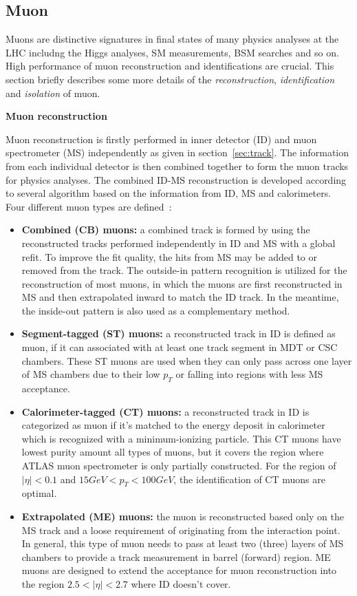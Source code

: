 \subsection{Muon}
\label{sec:muon}

Muons are distinctive signatures in final states of many physics analyses at the LHC includng the Higgs analyses, SM measurements, BSM searches and so on. 
High performance of muon reconstruction and identifications are crucial.
This section briefly describes some more details of the \textit{reconstruction}, \textit{identification} and \textit{isolation} of muon.

\textbf{Muon reconstruction}

Muon reconstruction is firstly performed in inner detector (ID) and muon spectrometer (MS) independently as given in section~\ref{sec:track}.
The information from each individual detector is then combined together to form the muon tracks for physics analyses.
The combined ID-MS reconstruction is developed according to several algorithm based on the information from ID, MS and calorimeters.
Four different muon types are defined~\cite{Aad:2016jkr}:
\begin{itemize}
	\item \textbf{Combined (CB) muons:} a combined track is formed by using the reconstructed tracks performed independently in ID and MS with a global refit. To improve the fit quality, the hits from MS may be added to or removed from the track. The outside-in pattern recognition is utilized for the reconstruction of most muons, in which the muons are first reconstructed in MS and then extrapolated inward to match the ID track. In the meantime, the inside-out pattern is also used as a complementary method.
	\item \textbf{Segment-tagged (ST) muons:} a reconstructed track in ID is defined as muon, if it can associated with at least one track segment in MDT or CSC chambers. These ST muons are used when they can only pass across one layer of MS chambers due to their low $p_{T}$ or falling into regions with less MS acceptance.
	\item \textbf{Calorimeter-tagged (CT) muons:} a reconstructed track in ID is categorized as muon if it's matched to the energy deposit in calorimeter which is recognized with a minimum-ionizing particle. This CT muons have lowest purity amount all types of muons, but it covers the region where ATLAS muon spectrometer is only partially constructed. For the region of $|\eta| < 0.1$ and $15 GeV < p_{T} < 100 GeV$, the identification of CT muons are optimal.
	\item \textbf{Extrapolated (ME) muons:} the muon is reconstructed based only on the MS track and a loose requirement of originating from the interaction point. In general, this type of muon needs to pass at least two (three) layers of MS chambers to provide a track measurement in barrel (forward) region. ME muons are designed to extend the acceptance for muon reconstruction into the region $2.5 < |\eta| < 2.7$ where ID doesn't cover.
\end{itemize}

